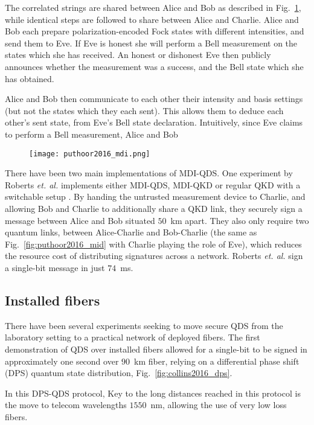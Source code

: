 The correlated strings are shared between Alice and Bob as described in Fig.~\ref{fig:puthoor2016_mdi}, while identical steps are followed to share between Alice and Charlie. Alice and Bob each prepare polarization-encoded Fock states with different intensities, and send them to Eve. If Eve is honest she will perform a Bell measurement  on the states which she has received. An honest or dishonest Eve then publicly announces whether the measurement was a success, and the Bell state which she has obtained.

Alice and Bob then communicate to each other their intensity and basis settings (but not the states which they each sent). This allows them to deduce each other's sent state, from Eve's Bell state declaration. Intuitively, since Eve claims to perform a Bell measurement, Alice and Bob 

\begin{figure}[htp]
\centering
\texttt{[image: puthoor2016\_mdi.png]}
\caption{\label{fig:puthoor2016_mdi}}
\end{figure}


There have been two main implementations of MDI-QDS. One experiment by Roberts \emph{et. al.} implements either MDI-QDS, MDI-QKD or regular QKD with a switchable setup \cite{Roberts2017}. By handing the untrusted measurement device to Charlie, and allowing Bob and Charlie to additionally share a QKD link, they securely sign a message between Alice and Bob situated $50$~km apart. They also only require two quantum links, between Alice-Charlie and Bob-Charlie (the same as Fig.~\ref{fig:puthoor2016_mid} with Charlie playing the role of Eve), which reduces the resource cost of distributing signatures across a network. Roberts \emph{et. al.} sign a single-bit message in just $74$~ms. 



\subsection*{Installed fibers}
There have been several experiments seeking to move secure QDS from the laboratory setting to a practical network of deployed fibers. The first demonstration of QDS over installed fibers allowed for a single-bit to be signed in approximately one second over $90$~km fiber, relying on a differential phase shift (DPS) quantum state distribution, Fig.~\ref{fig:collins2016_dps}.

In this DPS-QDS protocol,  
Key to the long distances reached in this protocol is the move to telecom wavelengths $1550$~nm, allowing the use of very low loss fibers. 

